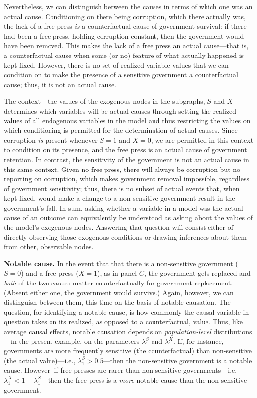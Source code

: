 \documentclass[12pt,]{book}
\begin{document}
Nevertheless, we can distinguish between the causes in terms of which one was an actual cause. Conditioning on there being corruption, which there actually was, the lack of a free press \emph{is} a counterfactual cause of government survival: if there had been a free press, holding corruption constant, then the government would have been removed. This makes the lack of a free press an actual cause---that is, a counterfactual cause when some (or no) feature of what actually happened is kept fixed. However, there is no set of realized variable values that we can condition on to make the presence of a sensitive government a counterfactual cause; thus, it is not an actual cause.

The context---the values of the exogenous nodes in the subgraphs, \(S\) and \(X\)---determines which variables will be actual causes through setting the realized values of all endogenous variables in the model and thus restricting the values on which conditioning is permitted for the determination of actual causes. Since corruption \emph{is} present whenever \(S=1\) and \(X=0\), we are permitted in this context to condition on its presence, and the free press is an actual cause of government retention. In contrast, the sensitivity of the government is not an actual cause in this same context. Given no free press, there will always be corruption but no reporting on corruption, which makes government removal impossible, regardless of government sensitivity; thus, there is no subset of actual events that, when kept fixed, would make a change to a non-sensitive government result in the government's fall. In sum, asking whether a variable in a model was the actual cause of an outcome can equivalently be understood as asking about the values of the model's exogenous nodes. Answering that question will consist either of directly observing those exogenous conditions or drawing inferences about them from other, observable nodes.

\textbf{Notable cause.} In the event that that there is a non-sensitive government (\(S=0\)) and a free press (\(X=1\)), as in panel \(C\), the government gets replaced and \emph{both} of the two causes matter counterfactually for government replacement. (Absent either one, the government would survive.) Again, however, we can distinguish between them, this time on the basis of notable causation. The question, for identifying a notable cause, is how commonly the causal variable in question takes on its realized, as opposed to a counterfactual, value. Thus, like average causal effects, notable causation depends on \emph{population-level} distributions---in the present example, on the parameters \(\lambda_1^S\) and \(\lambda_1^X\). If, for instance, governments are more frequently sensitive (the counterfactual) than non-sensitive (the actual value)---i.e., \(\lambda_1^S > 0.5\)---then the non-sensitive government is a notable cause. However, if free presses are rarer than non-sensitive governments---i.e.~\(\lambda_1^X < 1-\lambda_1^S\)---then the free press is a \emph{more} notable cause than the non-sensitive government.
\end{document}
